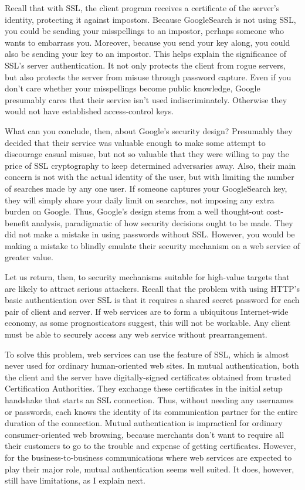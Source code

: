 Recall that with SSL, the client program receives a certificate of the
server's identity, protecting it against impostors.  Because
GoogleSearch is not using SSL, you could be sending your misspellings
to an impostor, perhaps someone who wants to embarrass you.  Moreover,
because you send your key along, you could also be sending your key to
an impostor.  This helps explain the significance of SSL's server
authentication.  It not only protects the client from rogue servers,
but also protects the server from misuse through password capture.
Even if you don't care whether your misspellings become public
knowledge, Google presumably cares that their service isn't used
indiscriminately.  Otherwise they would not have established
access-control keys.

What can you conclude, then, about Google's security design?
Presumably they decided that their service was valuable enough to make
some attempt to discourage casual misuse, but not so valuable that
they were willing to pay the price of SSL cryptography to keep
determined adversaries away.  Also, their main concern is not with the
actual identity of the user, but with limiting the number of searches
made by any one user.  If someone captures your GoogleSearch key, they
will simply share your daily limit on searches, not imposing any extra
burden on Google.  Thus, Google's design stems from a well thought-out
cost-benefit analysis, paradigmatic of how security decisions ought to
be made.  They did not make a mistake in using passwords without SSL.
However, you would be making a mistake to blindly emulate their
security mechanism on a web service of greater value.

Let us return, then, to security mechanisms suitable for high-value
targets that are likely to attract serious attackers.  Recall that the problem
with using HTTP's basic authentication over SSL is that it requires a
shared secret password for each pair of client and server.  If web
services are to form a ubiquitous Internet-wide economy, as some
prognosticators suggest, this will not be workable.  Any client must be able
to securely access any web service without prearrangement.

To solve this problem, web services can use the
 feature of SSL, which is almost
never used for ordinary human-oriented web sites.  In mutual
authentication, both the client and the server have digitally-signed
certificates obtained from trusted Certification Authorities.  They
exchange these certificates in the initial setup handshake that starts
an SSL connection.  Thus, without needing any usernames or passwords,
each knows the identity of its communication partner for the entire
duration of the connection.  Mutual authentication is impractical for
ordinary consumer-oriented web browsing, because merchants don't want
to require all their customers to go to the trouble and expense of
getting certificates.  However, for the business-to-business
communications where web services are expected to play their major
role, mutual authentication seems well suited.  It does, however,
still have limitations, as I explain next.

